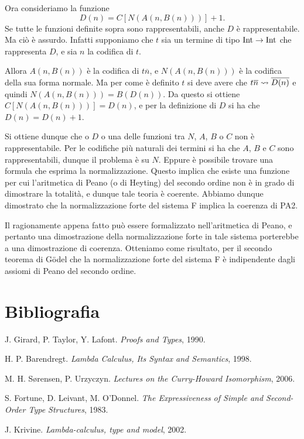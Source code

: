 \documentclass[]{marticle}
\begin{document}
Ora consideriamo la funzione
\[
    D(n) = C[N(A(n, B(n)))] + 1.
\]
Se tutte le funzioni definite sopra sono rappresentabili, anche $D$ \`e
rappresentabile. Ma ci\`o \`e assurdo. Infatti supponiamo che $t$ sia un termine
di tipo $\text{Int}\rightarrow\text{Int}$ che rappresenta $D$, e sia $n$ la codifica di $t$. 

Allora $A(n, B(n))$ \`e la codifica di $t\overline{n}$, e $N(A(n, B(n)))$ \`e la
codifica della sua forma normale. Ma per come \`e definito $t$ si deve avere che
$t\overline{n} \rightsquigarrow \overline{D(n)}$ e quindi $N(A(n, B(n))) = B(D(n))$.
Da questo si ottiene $C[N(A(n, B(n)))] = D(n)$, e per la definizione di $D$ si
ha che $D(n) = D(n)+1$.

Si ottiene dunque che o $D$ o una delle funzioni tra $N$, $A$, $B$ o $C$ non \`e
rappresentabile. Per le codifiche pi\`u naturali dei termini si ha che $A$, $B$
e $C$ sono rappresentabili, dunque il problema \`e su $N$. Eppure \`e possibile
trovare una formula che esprima la normalizzazione.
Questo implica che esiste una funzione per cui l'aritmetica di
Peano (o di Heyting) del secondo ordine non \`e in grado di dimostrare la
totalit\`a, e dunque tale teoria \`e coerente. Abbiamo dunque dimostrato che la
normalizzazione forte del sistema F implica la coerenza di PA2.

Il ragionamente appena fatto pu\`o essere formalizzato nell'aritmetica di Peano,
e pertanto una dimostrazione della normalizzazione forte in tale sistema
porterebbe a una dimostrazione di coerenza.  Otteniamo come risultato, per il
secondo teorema di G\"odel che la normalizzazione forte del sistema F \`e
indipendente dagli assiomi di Peano del secondo ordine.

\section{Bibliografia}
\begin{thebibliography}{0}
    J. Girard, P. Taylor, Y. Lafont.
    \textit{Proofs and Types}, 1990.

    H. P. Barendregt.
    \textit{Lambda Calculus, Its Syntax and Semantics},
    1998.

    M. H. S{\o}rensen, P. Urzyczyn.
    \textit{Lectures on the Curry-Howard Isomorphism},
    2006.

    S. Fortune, D. Leivant, M. O'Donnel.
    \textit{The Expressiveness of Simple and Second-Order Type Structures},
    1983.

    J. Krivine.
    \textit{Lambda-calculus, type and model},
    2002.

\end{thebibliography}
\end{document}
